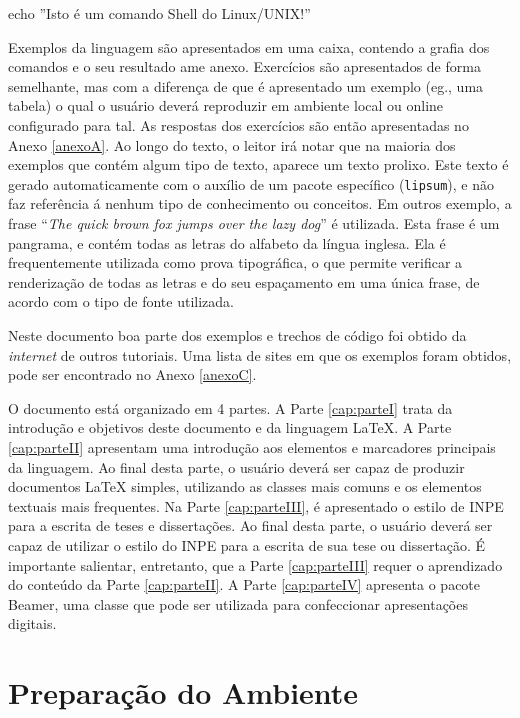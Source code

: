 \begin{commandshell}
echo ''Isto é um comando Shell do Linux/UNIX!''
\end{commandshell}

Exemplos da linguagem são apresentados em uma caixa, contendo a grafia dos comandos e o seu resultado ame anexo. Exercícios são apresentados de forma semelhante, mas com a diferença de que é apresentado um exemplo (eg., uma tabela) o qual o usuário deverá reproduzir em ambiente local ou online configurado para tal. As respostas dos exercícios são então apresentadas no Anexo \ref{anexoA}. Ao longo do texto, o leitor irá notar que na maioria dos exemplos que contém algum tipo de texto, aparece um texto prolixo. Este texto é gerado automaticamente com o auxílio de um pacote específico ({\tt lipsum}), e não faz referência á nenhum tipo de conhecimento ou conceitos. Em outros exemplo, a frase ``\textit{The quick brown fox jumps over the lazy dog}'' é utilizada. Esta frase é um pangrama, e contém todas as letras do alfabeto da língua inglesa. Ela é frequentemente utilizada como prova tipográfica, o que permite verificar a renderização de todas as letras e do seu espaçamento em uma única frase, de acordo com o tipo de fonte utilizada.

Neste documento boa parte dos exemplos e trechos de código foi obtido da \textit{internet} de outros tutoriais. Uma lista de sites em que os exemplos foram obtidos, pode ser encontrado no Anexo \ref{anexoC}.

O documento está organizado em 4 partes. A Parte \ref{cap:parteI} trata da introdução e objetivos deste documento e da linguagem \LaTeX{}. A Parte \ref{cap:parteII} apresentam uma introdução aos elementos e marcadores principais da linguagem. Ao final desta parte, o usuário deverá ser capaz de produzir documentos \LaTeX{} simples, utilizando as classes mais comuns e os elementos textuais mais frequentes. Na Parte \ref{cap:parteIII}, é apresentado o estilo de INPE para a escrita de teses e dissertações. Ao final desta parte, o usuário deverá ser capaz de utilizar o estilo do INPE para a escrita de sua tese ou dissertação. É importante salientar, entretanto, que a Parte \ref{cap:parteIII} requer o aprendizado do conteúdo da Parte \ref{cap:parteII}. A Parte \ref{cap:parteIV} apresenta o pacote Beamer, uma classe que pode ser utilizada para confeccionar apresentações digitais.

\section{Preparação do Ambiente}
\label{sec:prepara}

